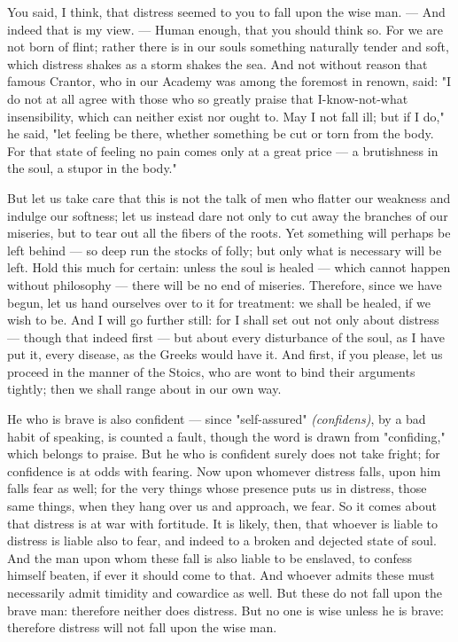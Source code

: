  You said, I think, that distress seemed to you to fall upon the wise man. — And indeed that is my view. — Human enough, that you should think so. For we are not born of flint; rather there is in our souls something naturally tender and soft, which distress shakes as a storm shakes the sea. And not without reason that famous Crantor, who in our Academy was among the foremost in renown, said: "I do not at all agree with those who so greatly praise that I-know-not-what insensibility, which can neither exist nor ought to. May I not fall ill; but if I do," he said, "let feeling be there, whether something be cut or torn from the body. For that state of feeling no pain comes only at a great price — a brutishness in the soul, a stupor in the body."

 But let us take care that this is not the talk of men who flatter our weakness and indulge our softness; let us instead dare not only to cut away the branches of our miseries, but to tear out all the fibers of the roots. Yet something will perhaps be left behind — so deep run the stocks of folly; but only what is necessary will be left. Hold this much for certain: unless the soul is healed — which cannot happen without philosophy — there will be no end of miseries. Therefore, since we have begun, let us hand ourselves over to it for treatment: we shall be healed, if we wish to be. And I will go further still: for I shall set out not only about distress — though that indeed first — but about every disturbance of the soul, as I have put it, every disease, as the Greeks would have it. And first, if you please, let us proceed in the manner of the Stoics, who are wont to bind their arguments tightly; then we shall range about in our own way.

 He who is brave is also confident — since "self-assured" \textit{(confidens)}, by a bad habit of speaking, is counted a fault, though the word is drawn from "confiding," which belongs to praise. But he who is confident surely does not take fright; for confidence is at odds with fearing. Now upon whomever distress falls, upon him falls fear as well; for the very things whose presence puts us in distress, those same things, when they hang over us and approach, we fear. So it comes about that distress is at war with fortitude. It is likely, then, that whoever is liable to distress is liable also to fear, and indeed to a broken and dejected state of soul. And the man upon whom these fall is also liable to be enslaved, to confess himself beaten, if ever it should come to that. And whoever admits these must necessarily admit timidity and cowardice as well. But these do not fall upon the brave man: therefore neither does distress. But no one is wise unless he is brave: therefore distress will not fall upon the wise man.

